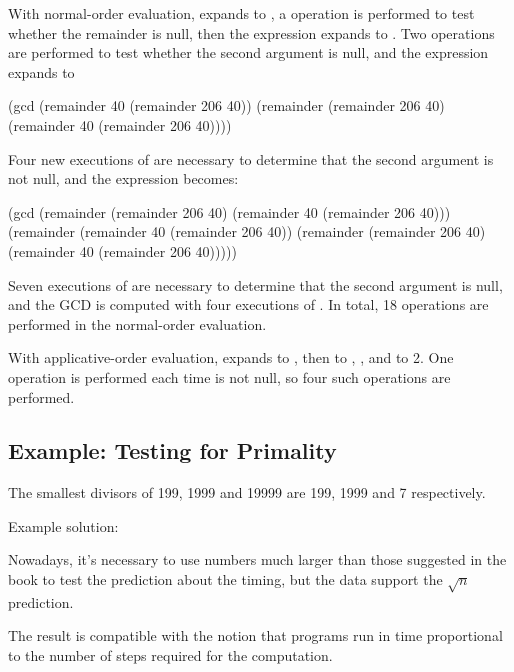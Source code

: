 \begin{exe}[1.20]
    With normal-order evaluation,  expands to
    , a  operation is 
    performed to test whether the remainder is null, then the expression expands 
    to . Two 
     operations are performed to test whether the second 
    argument is null, and the expression expands to
    \begin{cscm}
        (gcd (remainder 40 (remainder 206 40))
             (remainder (remainder 206 40) (remainder 40 (remainder 206 40))))
    \end{cscm}
    Four new executions of  are necessary to determine that the 
    second argument is not null, and the expression becomes:
    \begin{cscm}
        (gcd (remainder (remainder 206 40) (remainder 40 (remainder 206 40)))
             (remainder (remainder 40 (remainder 206 40))
                        (remainder (remainder 206 40)
                                   (remainder 40 (remainder 206 40)))))
    \end{cscm}
    Seven executions of  are necessary to determine that the 
    second argument is null, and the GCD is computed with four executions of 
    . In total, 18  operations are performed in 
    the normal-order evaluation.

    \bigskip

    With applicative-order evaluation,  expands to
    , then to , ,
     and to 2. One  operation is performed each 
    time  is not null, so four such operations are performed.
\end{exe}

\subsection{Example: Testing for Primality}

\begin{exe}[1.21]
    The smallest divisors of 199, 1999 and 19999 are 199, 1999 and 
    7 respectively.
\end{exe}

\begin{exe}[1.22]
    Example solution:

    Nowadays, it’s necessary to use numbers much larger than those suggested in 
    the book to test the prediction about the timing, but the data support the 
    $\sqrt{n}$ prediction.

    The result is compatible with the notion that programs run in time 
    proportional to the number of steps required for the computation.
\end{exe}

